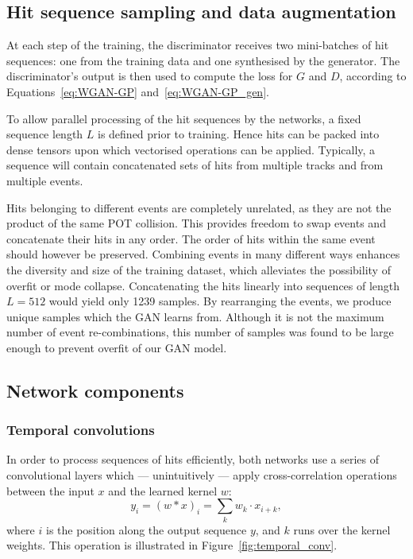 

\subsection{Hit sequence sampling and data augmentation}
At each step of the training, the discriminator receives two mini-batches of hit
sequences: one from the training data and one synthesised by the generator. The
discriminator's output is then used to compute the loss for $G$ and $D$,
according to Equations~\ref{eq:WGAN-GP} and~\ref{eq:WGAN-GP_gen}.

To allow parallel processing of the hit sequences by the networks, a fixed
sequence length $L$ is defined prior to training. Hence hits can be packed
into dense tensors upon which vectorised operations can be applied. Typically, a
sequence will contain concatenated sets of hits from multiple tracks and from
multiple events.

Hits belonging to different events are completely unrelated, as they are not the
product of the same POT collision. This provides freedom to swap events and
concatenate their hits in any order. The order of hits within the same event
should however be preserved. 
Combining events in many different ways enhances the diversity and size of the
training dataset, which alleviates the possibility of overfit or mode collapse.
Concatenating the  hits linearly into sequences of length
$L=512$ would yield only 1239 samples. By rearranging the events, we produce
 unique samples which the GAN learns from. Although it is not
the maximum number of event re-combinations, this number of samples was found to
be large enough to prevent overfit of our GAN model.


\subsection{Network components}

\subsubsection{Temporal convolutions}
In order to process sequences of hits efficiently, both networks use a series of
convolutional layers which --- unintuitively --- apply cross-correlation
operations between the input $x$ and the learned kernel $w$:
\begin{equation}\label{eq:conv1d}
    y_{i} = (w \ast x)_{i} = \sum_{k} w_k \cdot x_{i+k},
\end{equation}
where $i$ is the position along the output sequence $y$, and $k$ runs over the
kernel weights. This operation is illustrated in Figure~\ref{fig:temporal_conv}.

